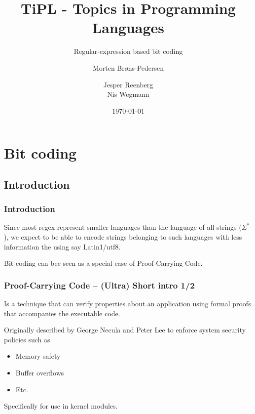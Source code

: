 \documentclass[slidestop,compress,mathserif, xcolor=table]{beamer}
\title[]{TiPL - Topics in Programming Languages}
\subtitle{Regular-expression based bit coding}
\author[Morten Brøns-Pedersen \and Jesper Reenberg \and Nis Wegmann]
       {Morten Brøns-Pedersen \and
        Jesper Reenberg  \\
        Nis Wegmann }
\institute[DIKU]{Department of Computer Science}
\date[]{\today}
\begin{document}
\frame[plain]{\titlepage}

\section{Bit coding}

\subsection{Introduction}

\begin{frame}[c]
  \frametitle{Introduction}
     
  Since most regex represent smaller languages than the language of all strings
  ($\Sigma^\ast$), we expect to be able to encode strings belonging to such
  languages with less information the using say Latin1/utf8. \newline

  \begin{block}{}
      Bit coding can bee seen as a special case of Proof-Carrying Code.
  \end{block}
  
\end{frame}

\begin{frame}
  \frametitle{Proof-Carrying Code -- (Ultra) Short intro 1/2}
  
  \begin{definition}[Weak]
    Is a technique that can verify properties about an application using formal
    proofs that accompanies the executable code.
  \end{definition}

  Originally described by George Necula and Peter Lee\cite{nele1996} to
  enforce system security policies such as

  \begin{itemize}
  \item Memory safety
  \item Buffer overflows
  \item Etc.
  \end{itemize}

  Specifically for use in kernel modules.

\end{frame}
\end{document}

